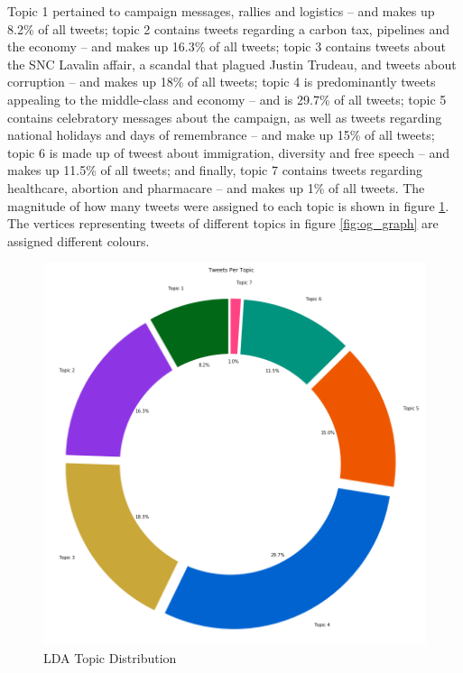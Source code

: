 Topic 1 pertained to campaign messages, rallies and logistics -- and makes up
8.2\% of all tweets; topic 2 contains tweets regarding a carbon tax, pipelines
and the economy -- and makes up 16.3\% of all tweets; topic 3 contains tweets
about the SNC Lavalin affair, a scandal that plagued Justin Trudeau, and tweets
about corruption -- and makes up 18\% of all tweets; topic 4 is predominantly
tweets appealing to the middle-class and economy -- and is 29.7\% of all tweets;
topic 5 contains celebratory messages about the campaign, as well as tweets
regarding national holidays and days of remembrance -- and make up 15\% of all
tweets; topic 6 is made up of tweest about immigration, diversity and free
speech -- and makes up 11.5\% of all tweets; and finally, topic 7 contains
tweets regarding healthcare, abortion and pharmacare -- and makes up 1\% of all
tweets. The magnitude of how many tweets were assigned to each topic is shown in
figure \ref{fig:topic_distribution}. The vertices representing tweets of different
topics in figure \ref{fig:og_graph} are assigned different colours. 

\begin{singlespacing}
    \begin{figure}[H]
    \centering
    \includegraphics[scale=0.2]{Figures/topic_distribution}
    \caption[LDA Topic Distribution]{LDA Topic Distribution}
    \label{fig:topic_distribution}
    \end{figure}
\end{singlespacing}






